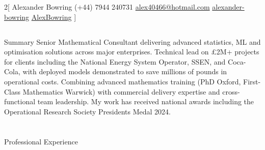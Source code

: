 \documentclass{my_cv}
\begin{document}
\begin{multicols}{2}[
    \titletext{}%
    		{Alexander Bowring}
        {}%
        {(+44) 7944 240731}%
        {\href{mailto:alex40466@hotmail.com}{alex40466@hotmail.com}}%
        {\href{https://www.linkedin.com/in/alexander-bowring/}{alexander-bowring}}%
        {\href{https://github.com/AlexBowring/}{AlexBowring}}
]

\end{multicols}

\vspace{-1.7cm}
\begin{tcolorbox}[colback=white,colframe=black,width=\dimexpr\textwidth+12mm\relax,enlarge left by=-6mm]
\section{\faStickyNote}{Summary}
Senior Mathematical Consultant delivering advanced statistics, ML and optimisation solutions across major enterprises. Technical lead on £2M+ projects for clients including the National Energy System Operator, SSEN, and Coca-Cola, with deployed models demonstrated to save millions of pounds in operational costs.
Combining advanced mathematics training (PhD Oxford, First-Class Mathematics Warwick) with commercial delivery expertise and cross-functional team leadership. My work has received national awards including the Operational Research Society Presidents Medal 2024.
\end{tcolorbox}

\section{\faBriefcase}{Professional Experience}
\end{document}
